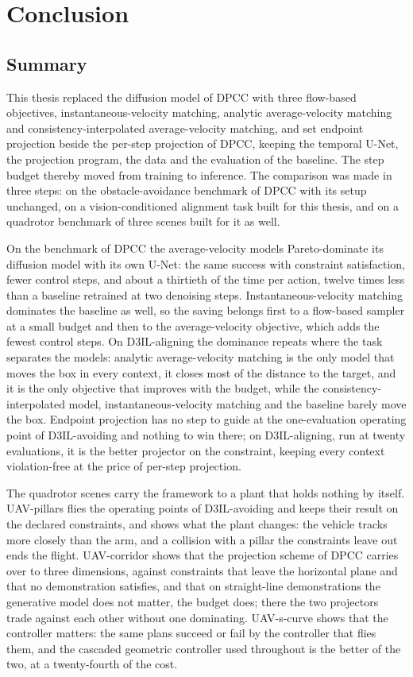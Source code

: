 \chapter{Conclusion}\label{ch:conclusion}

\section{Summary}\label{sec:conc:summary}

This thesis replaced the diffusion model of \ac{DPCC} with three flow-based objectives,
instantaneous-velocity matching, analytic average-velocity matching and consistency-interpolated
average-velocity matching, and set endpoint projection beside the per-step projection of \ac{DPCC},
keeping the temporal U-Net, the projection program, the data and the evaluation of the baseline. The
step budget thereby moved from training to inference. The comparison was made in three steps: on the
obstacle-avoidance benchmark of \ac{DPCC} with its setup unchanged, on a vision-conditioned alignment
task built for this thesis, and on a quadrotor benchmark of three scenes built for it as well.

On the benchmark of \ac{DPCC} the average-velocity models Pareto-dominate its diffusion model with its
own U-Net: the same success with constraint satisfaction, fewer control steps, and about a thirtieth
of the time per action, twelve times less than a baseline retrained at two denoising steps.
Instantaneous-velocity matching dominates the baseline as well, so the saving belongs first to a
flow-based sampler at a small budget and then to the average-velocity objective, which adds the fewest
control steps. On D3IL-aligning the dominance repeats where the task separates the models: analytic
average-velocity matching is the only model that moves the box in every context, it closes most of
the distance to the target, and it is the only objective that improves with the budget, while the
consistency-interpolated model, instantaneous-velocity matching and the baseline barely move the box.
Endpoint projection has no step to guide at the one-evaluation operating point of D3IL-avoiding and
nothing to win there; on D3IL-aligning, run at twenty evaluations, it is the better projector on the
constraint, keeping every context violation-free at the price of per-step projection.

The quadrotor scenes carry the framework to a plant that holds nothing by itself. UAV-pillars flies
the operating points of D3IL-avoiding and keeps their result on the declared constraints, and shows
what the plant changes: the vehicle tracks more closely than the arm, and a collision with a pillar the
constraints leave out ends the flight. UAV-corridor shows that the projection scheme of \ac{DPCC}
carries over to three dimensions, against constraints that leave the horizontal plane and that no
demonstration satisfies, and that on straight-line demonstrations the generative model does not
matter, the budget does; there the two projectors trade against each other without one dominating.
UAV-s-curve shows that the controller matters: the same plans succeed or fail by the controller that
flies them, and the cascaded geometric controller used throughout is the better of the two, at a
twenty-fourth of the cost.

